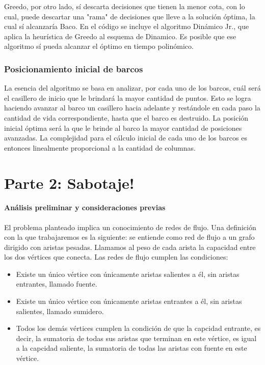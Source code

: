 \documentclass{article}
\begin{document}
Greedo, por otro lado, sí descarta decisiones que tienen la menor cota, con lo cual, puede descartar una "rama" de decisiones que lleve a la solución óptima, la cual sí alcanzaría Baco. En el código se incluye el algoritmo Dinámico Jr., que aplica la heurística de Greedo al esquema de Dinamico. Es posible que ese algoritmo sí pueda alcanzar el óptimo en tiempo polinómico.

\section{Posicionamiento inicial de barcos}
La esencia del algoritmo se basa en analizar, por cada uno de los barcos, cuál 
será el casillero de inicio que le brindará la mayor cantidad de puntos. Esto 
se logra haciendo avanzar al barco un casillero hacia adelante y restándole en 
cada paso la cantidad de vida correspondiente, hasta que el barco es destruido.
La posición inicial óptima será la que le brinde al barco la mayor cantidad de 
posiciones avanzadas. La complejidad para el cálculo inicial de cada uno de los
barcos es entonces linealmente proporcional a la cantidad de columnas. 

\newpage
\part{Parte 2: Sabotaje!}

\subsection{Análisis preliminar y consideraciones previas}
El problema planteado implica un conocimiento de redes de flujo. Una definición con la que trabajaremos es la siguiente: se entiende como red de flujo a un grafo dirigido con aristas pesadas. Llamamos al peso de cada arista la capacidad entre los dos vértices que conecta. Las redes de flujo cumplen las condiciones:
\begin{itemize}
    \item Existe un único vértice con únicamente aristas salientes a él, sin aristas entrantes, llamado fuente.
    \item Existe un único vértice con únicamente aristas entrantes a él, sin aristas salientes, llamado sumidero.
    \item Todos los demás vértices cumplen la condición de que la capcidad entrante, es decir, la sumatoria de todas sus aristas que terminan en este vértice, es igual a la capcidad saliente, la sumatoria de todas las aristas con fuente en este vértice.
\end{itemize}
\end{document}
